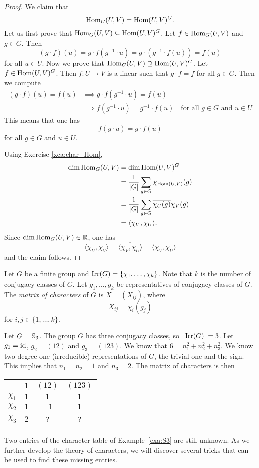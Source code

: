 \begin{proof}
    We claim that 
    \[
    \operatorname{Hom}_G(U,V)=\operatorname{Hom}(U,V)^G.
    \]
    Let us first prove that
    $\operatorname{Hom}_G(U,V)\subseteq\operatorname{Hom}(U,V)^G$. Let $f\in \operatorname{Hom}_G(U,V)$ and 
    $g\in G$. Then
    \[
    (g\cdot f)(u)=g\cdot f(g^{-1}\cdot u)=g\cdot (g^{-1}\cdot f(u))=f(u)
    \]
    for all $u\in U$. Now we prove that $\operatorname{Hom}_G(U,V)\supseteq\operatorname{Hom}(U,V)^G$.
    Let $f\in\operatorname{Hom}(U,V)^G$. Then $f\colon U\to V$ is a linear such that
    $g\cdot f=f$ for all $g\in G$. Then
    we compute 
    \begin{align*}
    (g\cdot f)(u)=f(u)&\implies 
    g\cdot f(g^{-1}\cdot u)=f(u)\\
    &\implies f(g^{-1}\cdot u)=g^{-1}\cdot f(u)\quad 
    \text{for all $g\in G$ and $u\in U$}
    \end{align*}
    This means that one has 
    \[
    f(g\cdot u)=g\cdot f(u)
    \]
    for all $g\in G$ and $u\in U$. 
    
    Using Exercise \ref{xca:char_Hom}, 
    \begin{align*}
        \dim\operatorname{Hom}_G(U,V) &= \dim\operatorname{Hom}(U,V)^G\\
        &=\frac{1}{|G|}\sum_{g\in G}\chi_{\operatorname{Hom}(U,V)}(g)\\
        &=\frac{1}{|G|}\sum_{g\in G}\overline{\chi_U(g)}\chi_V(g)\\
        &=\langle \chi_V,\chi_U\rangle.
    \end{align*}
    Since $\dim\operatorname{Hom}_G(U,V)\in\mathbb{R}$, one has    
    \[
\langle\chi_U,\chi_V\rangle=\overline{\langle\chi_V,\chi_U\rangle}=\langle\chi_V,\chi_U\rangle
    \]
    and the claim follows. 
\end{proof}

Let $G$ be a finite group and $\operatorname{Irr}(G)=\{\chi_1,\dots,\chi_k\}$. 
Note that $k$ is the number of conjugacy classes of $G$. Let 
$g_1,\dots,g_k$ be representatives of conjugacy classes of $G$. 
The \emph{matrix of characters} of $G$ 
is $X=(X_{ij})$, where 
\[
X_{ij}=\chi_i(g_j)
\]
for $i,j\in\{1,\dots,k\}$. 

\begin{example}
\label{exa:S3}
    Let $G=\mathbb{S}_3$. The group $G$ has three conjugacy classes, so
    $|\operatorname{Irr}(G)|=3$. Let $g_1=\operatorname{id}$, $g_2=(12)$ and $g_3=(123)$. We 
    know that $6=n_1^2+n_2^2+n_3^2$. We know two degree-one
    (irreducible) representations of $G$, the trivial one and
    the sign. This implies that $n_1=n_2=1$ and 
    $n_3=2$. 
    The matrix of characters is then
    \begin{center}
		\begin{tabular}{|c|ccc|}
			\hline
			& $1$ & $(12)$ & $(123)$ \tabularnewline
			\hline 
			$\chi_{1}$ & $1$ & $1$ & $1$\tabularnewline
			$\chi_{2}$ & $1$ & $-1$ & $1$ \tabularnewline
			$\chi_{3}$ & $2$ & ? & ? \tabularnewline
			\hline
		\end{tabular}
	\end{center}
\end{example}

Two entries of the character table of Example~\ref{exa:S3} 
are still unknown. As we further develop the theory of characters, we will discover several tricks that can be used to find these missing entries.
